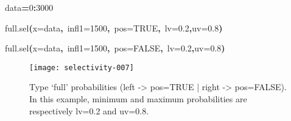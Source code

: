 \documentclass[letterpaper, 12pt]{article}
\newenvironment{Hinput}%
{}%
{}%
\newenvironment{Hchunk}%
{\vspace{0.5em}\par\begin{flushleft}}%
{\end{flushleft}}%
\newcommand{\hlnumber}[1]{\textcolor[rgb]{0.0823529411764706,0.0784313725490196,0.709803921568627}{#1}}%
\newcommand{\hlfunctioncall}[1]{\textcolor[rgb]{1,0,0}{#1}}%
\newcommand{\hlkeyword}[1]{\textcolor[rgb]{0,0,0}{\textbf{#1}}}%
\newcommand{\hlargument}[1]{\textcolor[rgb]{0.694117647058824,0.247058823529412,0.0196078431372549}{#1}}%
\newcommand{\hlassignement}[1]{\textcolor[rgb]{0.215686274509804,0.215686274509804,0.384313725490196}{\textbf{#1}}}%
\newcommand{\hlsymbol}[1]{\textcolor[rgb]{0,0,0}{#1}}%
\newcommand{\hlprompt}[1]{\textcolor[rgb]{0,0,0}{#1}}%
\begin{document}
\begin{Hchunk}
\begin{normalsize}
\begin{Hinput}
\ttfamily\noindent
\hlprompt{\usebox{\hlnormalsizeboxgreaterthan}{\ }}\hlsymbol{data}\hlassignement{=}\hlnumber{0}\hlkeyword{:}\hlnumber{3000}\mbox{}
\normalfont
\end{Hinput}


\begin{Hinput}
\ttfamily\noindent
\hlprompt{\usebox{\hlnormalsizeboxgreaterthan}{\ }}\hlfunctioncall{full.sel}\hlkeyword{(}\hlargument{x}\hlargument{=}\hlsymbol{data}\hlkeyword{,}{\ }\hlargument{infl1}\hlargument{=}\hlnumber{1500}\hlkeyword{,}{\ }\hlargument{pos}\hlargument{=}\hlnumber{TRUE}\hlkeyword{,}{\ }\hlargument{lv}\hlargument{=}\hlnumber{0.2}\hlkeyword{,}\hlargument{uv}\hlargument{=}\hlnumber{0.8}\hlkeyword{)}\mbox{}
\normalfont
\end{Hinput}


\begin{Hinput}
\ttfamily\noindent
\hlprompt{\usebox{\hlnormalsizeboxgreaterthan}{\ }}\hlfunctioncall{full.sel}\hlkeyword{(}\hlargument{x}\hlargument{=}\hlsymbol{data}\hlkeyword{,}{\ }\hlargument{infl1}\hlargument{=}\hlnumber{1500}\hlkeyword{,}{\ }\hlargument{pos}\hlargument{=}\hlnumber{FALSE}\hlkeyword{,}{\ }\hlargument{lv}\hlargument{=}\hlnumber{0.2}\hlkeyword{,}\hlargument{uv}\hlargument{=}\hlnumber{0.8}\hlkeyword{)}\mbox{}
\normalfont
\end{Hinput}


\end{normalsize}
\end{Hchunk}


\begin{figure}[h]
\vspace{-20pt}
\begin{center}
\texttt{[image: selectivity-007]}
\end{center}
\vspace{-30pt}
\caption{Type `full' probabilities (left -> pos=TRUE |  right -> pos=FALSE). In this example, minimum and maximum probabilities are respectively lv=0.2 and uv=0.8.}
\vspace{-10pt}
\label{fig3}
\end{figure}

\newpage
\end{document}
